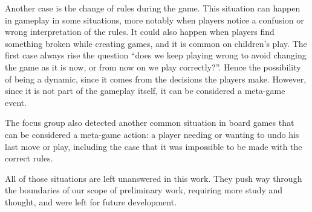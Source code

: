 Another case is the change of rules during the game.
This situation can happen in gameplay in some situations,
more notably when players notice a confusion or wrong
interpretation of the rules. It could also happen when players
find something broken while creating games, and it is
common on children’s play. The first case always rise the
question “does we keep playing wrong to avoid changing
the game as it is now, or from now on we play correctly?”.
Hence the possibility of being a dynamic, since it comes
from the decisions the players make. However, since it is
not part of the gameplay itself, it can be considered a meta-game
event.

The focus group also detected another common situation
in board games that can be considered a meta-game action:
a player needing or wanting to undo his last move or play,
including the case that it was impossible to be made with
the correct rules. 

All of those situations are left unanswered in this work.
They push way through the boundaries of our scope of
preliminary work, requiring more study and thought, and
were left for future development.

